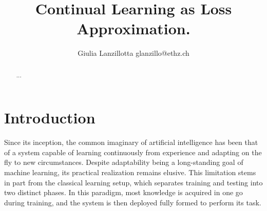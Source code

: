 \documentclass[10pt]{article} %
\title{Continual Learning as Loss Approximation.}
\author{\name Giulia Lanzillotta \email glanzillo@ethz.ch}
\newcommand{\hessian}{\vH}
\begin{document}
\maketitle

\begin{abstract}
    ...
\end{abstract}

\section{Introduction}
\label{sec:introduction}

 Since its inception, the common imaginary of artificial intelligence has been that of a system capable of learning continuously from experience and adapting on the fly to new circumstances. Despite adaptability being a long-standing goal of machine learning, its practical realization remains elusive. This limitation stems in part from the classical learning setup, which separates training and testing into two distinct phases. In this paradigm, most knowledge is acquired in one go during training, and the system is then deployed fully formed to perform its task. 
\end{document}
